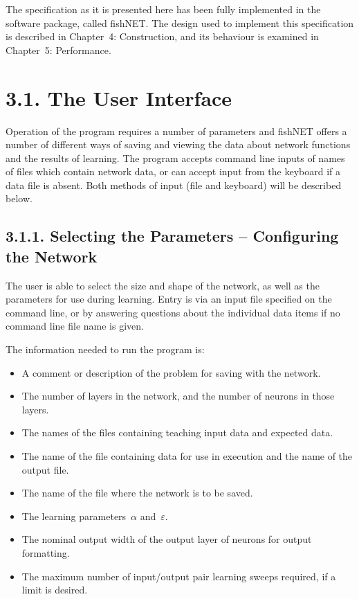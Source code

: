 \documentclass[12pt]{report}
\begin{document}
The specification as it is presented here has been fully implemented in
the software package, called fishNET.
The design used to implement this specification is described in
Chapter~4: Construction, and its behaviour is examined in Chapter~5:
Performance.

\section{3.1. The User Interface}

Operation of the program requires a number of parameters and fishNET
offers a number of different ways of saving and viewing the
data about network functions and the results of learning.
The program accepts command line inputs of names of files which
contain network data, or can accept input from the keyboard if a
data file is absent.
Both methods of input (file and keyboard) will be described below.

\subsection{3.1.1. Selecting the Parameters -- Configuring the Network}

The user is able to select the size and shape of the network, as
well as the parameters for use during learning.
Entry is via an input file specified on the command line, or by
answering questions about the individual data items if no command
line file name is given.

The information needed to run the program is:

\begin{itemize}
\item A comment or description of the problem for saving
with the network.
\item The number of layers in the network, and the number
of neurons in those layers.
\item The names of the files containing teaching input
data and expected data.
\item The name of the file containing data for use in
execution and the name of the output file.
\item The name of the file where the network is to be
saved.
\item The learning parameters~$\alpha$ and~$\varepsilon$.
\item The nominal output width of the output layer of
neurons for output formatting.
\item The maximum number of input/output pair learning
sweeps required, if a limit is desired.
\end{itemize}
\end{document}
